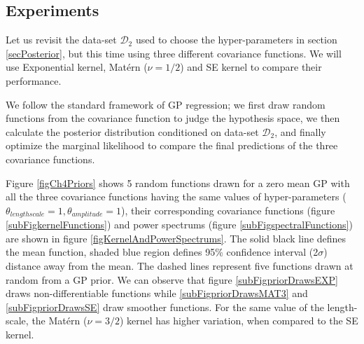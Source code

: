 \subsection{Experiments}\label{subsecCH4Experiments}
\begin{mdframed}[hidealllines=true,backgroundcolor=lightgray!20]
Let us revisit the data-set $\mathcal{D}_{2}$ used to choose the hyper-parameters in section \ref{secPosterior}, but this time using three different covariance functions. We will use Exponential kernel, Mat\'ern ($\nu=1/2$) and SE kernel to compare their performance. 

We follow the standard framework of GP regression; we first draw random functions from the covariance function to judge the hypothesis space, we then calculate the posterior distribution conditioned on data-set $\mathcal{D}_{2}$, and finally optimize the marginal likelihood to compare the final predictions of the three covariance functions. 

Figure \ref{figCh4Priors} shows 5 random functions drawn for a zero mean GP with all the three covariance functions having the same values of hyper-parameters ($\theta_{lengthscale} = 1, \theta_{amplitude} = 1$), their corresponding covariance functions (figure \ref{subFigkernelFunctions}) and power spectrums (figure \ref{subFigspectralFunctions}) are shown in figure \ref{figKernelAndPowerSpectrums}. The solid black line defines the mean function, shaded blue region defines 95\% confidence interval (2$\sigma$) distance away from the mean. The dashed lines represent five functions drawn at random from a GP prior. We can observe that figure \ref{subFigpriorDrawsEXP} draws non-differentiable functions while \ref{subFigpriorDrawsMAT3} and \ref{subFigpriorDrawsSE} draw smoother functions. For the same value of the length-scale, the Mat\'ern ($\nu=3/2$) kernel has higher variation, when compared to the SE kernel.
\end{mdframed}

